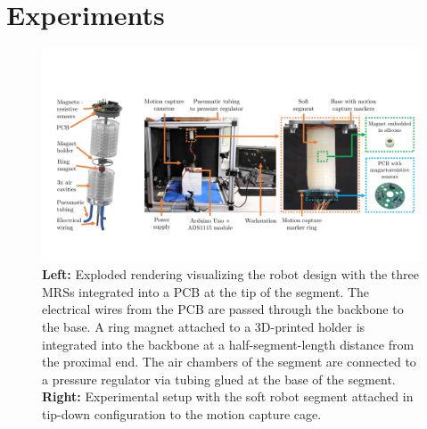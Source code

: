 \section{Experiments}\label{sec:promasens:experiments}
\begin{figure}[hbt]
    \centering
    \includegraphics[width=1.0\textwidth]{promasens/figures/experimental_setup/experimental_setup_v5_compressed.pdf}
    \caption{
    \textbf{Left:} Exploded rendering visualizing the robot design with the three \glspl{MRS} integrated into a PCB at the tip of the segment. The electrical wires from the \gls{PCB} are passed through the backbone to the base. A ring magnet attached to a 3D-printed holder is integrated into the backbone at a half-segment-length distance from the proximal end. The air chambers of the segment are connected to a pressure regulator via tubing glued at the base of the segment. \textbf{Right:} Experimental setup with the soft robot segment attached in tip-down configuration to the motion capture cage.
    }\label{fig:promasens:experimental_setup}
\end{figure}
